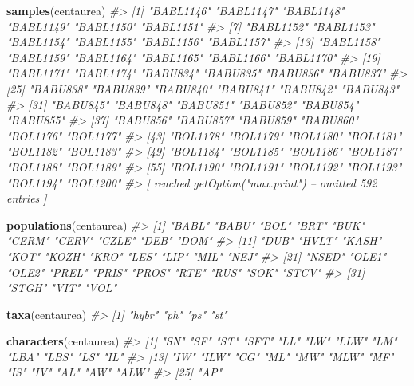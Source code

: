 \documentclass[
]{article}
\newenvironment{Shaded}{\begin{snugshade}}{\end{snugshade}}
\newcommand{\CommentTok}[1]{\textcolor[rgb]{0.56,0.35,0.01}{\textit{#1}}}
\newcommand{\KeywordTok}[1]{\textcolor[rgb]{0.13,0.29,0.53}{\textbf{#1}}}
\newcommand{\NormalTok}[1]{#1}
\begin{document}
\begin{Shaded}
\begin{Highlighting}[]
\KeywordTok{samples}\NormalTok{(centaurea)}
\CommentTok{#>  [1] "BABL1146" "BABL1147" "BABL1148" "BABL1149" "BABL1150" "BABL1151"}
\CommentTok{#>  [7] "BABL1152" "BABL1153" "BABL1154" "BABL1155" "BABL1156" "BABL1157"}
\CommentTok{#> [13] "BABL1158" "BABL1159" "BABL1164" "BABL1165" "BABL1166" "BABL1170"}
\CommentTok{#> [19] "BABL1171" "BABL1174" "BABU834"  "BABU835"  "BABU836"  "BABU837" }
\CommentTok{#> [25] "BABU838"  "BABU839"  "BABU840"  "BABU841"  "BABU842"  "BABU843" }
\CommentTok{#> [31] "BABU845"  "BABU848"  "BABU851"  "BABU852"  "BABU854"  "BABU855" }
\CommentTok{#> [37] "BABU856"  "BABU857"  "BABU859"  "BABU860"  "BOL1176"  "BOL1177" }
\CommentTok{#> [43] "BOL1178"  "BOL1179"  "BOL1180"  "BOL1181"  "BOL1182"  "BOL1183" }
\CommentTok{#> [49] "BOL1184"  "BOL1185"  "BOL1186"  "BOL1187"  "BOL1188"  "BOL1189" }
\CommentTok{#> [55] "BOL1190"  "BOL1191"  "BOL1192"  "BOL1193"  "BOL1194"  "BOL1200" }
\CommentTok{#>  [ reached getOption("max.print") -- omitted 592 entries ]}
\end{Highlighting}
\end{Shaded}

\begin{Shaded}
\begin{Highlighting}[]
\KeywordTok{populations}\NormalTok{(centaurea)}
\CommentTok{#>  [1] "BABL" "BABU" "BOL"  "BRT"  "BUK"  "CERM" "CERV" "CZLE" "DEB"  "DOM" }
\CommentTok{#> [11] "DUB"  "HVLT" "KASH" "KOT"  "KOZH" "KRO"  "LES"  "LIP"  "MIL"  "NEJ" }
\CommentTok{#> [21] "NSED" "OLE1" "OLE2" "PREL" "PRIS" "PROS" "RTE"  "RUS"  "SOK"  "STCV"}
\CommentTok{#> [31] "STGH" "VIT"  "VOL"}
\end{Highlighting}
\end{Shaded}

\begin{Shaded}
\begin{Highlighting}[]
\KeywordTok{taxa}\NormalTok{(centaurea)}
\CommentTok{#> [1] "hybr" "ph"   "ps"   "st"}
\end{Highlighting}
\end{Shaded}

\begin{Shaded}
\begin{Highlighting}[]
\KeywordTok{characters}\NormalTok{(centaurea)}
\CommentTok{#>  [1] "SN"  "SF"  "ST"  "SFT" "LL"  "LW"  "LLW" "LM"  "LBA" "LBS" "LS"  "IL" }
\CommentTok{#> [13] "IW"  "ILW" "CG"  "ML"  "MW"  "MLW" "MF"  "IS"  "IV"  "AL"  "AW"  "ALW"}
\CommentTok{#> [25] "AP"}
\end{Highlighting}
\end{Shaded}
\end{document}
